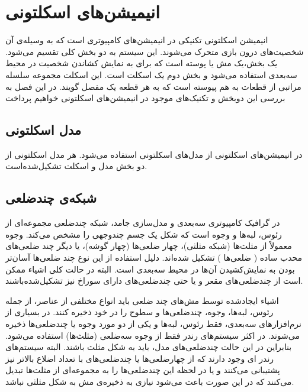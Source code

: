 \chapter { انیمیشن‌های اسکلتونی }


انیمیشن‌ اسکلتونی تکنیکی در انیمیشن‌های کامپیوتری است که به وسیله‌ی آن شخصیت‌های درون بازی متحرک می‌شوند. 
این سیستم به دو بخش کلی تقسیم می‌شود.
یک بخش،یک مش یا پوسته است که برای به نمایش کشاندن شخصیت در محیط سه‌بعدی استفاده می‌شود و بخش دوم یک اسکلت است. این اسکلت مجموعه سلسله مراتبی از قطعات به‌ هم پیوسته است که به هر قطعه یک مفصل گویند.
در این فصل به بررسی این دوبخش و تکنیک‌های موجود در انیمیشن‌های اسکلتونی خواهیم پرداخت

\section{مدل اسکلتونی}

در انیمیشن‌های اسکلتونی از مدل‌های اسکلتونی استفاده می‌شود. هر مدل اسکلتونی از دو بخش مدل و اسکلت تشکیل‌شده‌است. 

\section{شبکه‌ی\protect{} چندضلعی}

در گرافیک کامپیوتری سه‌بعدی و مدل‌سازی جامد، شبکه چند‌ضلعی مجموعه‌ای از رئوس، لبه‌ها و وجوه است که شکل یک جسم چند‌وجهی را مشخص می‌کند.
وجوه معمولاً از مثلث‌ها (شبکه مثلثی)، چهار ضلعی‌ها (چهار گوشه)، یا دیگر چند ضلعی‌های محدب ساده
(
	ضلعی‌ها
)
تشکیل شده‌اند. دلیل استفاده از این نوع چند ضلعی‌ها آسان‌تر بودن به نمایش‌کشیدن آن‌ها در محیط سه‌بعدی است.
البته در حالت کلی اشیاء ممکن است از چندضلعی‌های مقعر و یا حتی چندضلعی‌های دارای سوراخ نیز تشکیل‌شده‌باشند.

اشیاء ایجادشده توسط مش‌های چند ضلعی باید انواع مختلفی از عناصر، از جمله رئوس، لبه‌ها، وجوه، چندضلعی‌ها و سطوح را در خود ذخیره کنند.
در بسیاری از نرم‌افزارهای سه‌بعدی، فقط رئوس، لبه‌ها و یکی از دو مورد وجوه یا چند‌ضلعی‌ها ذخیره می‌شوند.
در اکثر سیستم‌های رندر
فقط از وجوه سه‌ضلعی
(مثلث‌ها)
استفاده‌ می‌شود.
بنابراین در این حالت چند‌ضلعی‌های مدل، باید به شکل مثلث باشند. البته سیستم‌های رندر‌ ای وجود دارند که از چهارضلعی‌ها یا چندضلعی‌های با تعداد اضلاع بالاتر نیز پشتیبانی ‌می‌کنند و یا در لحظه این چندضلعی‌ها را به مجموعه‌ای از مثلث‌ها تبدیل می‌کنند که در این صورت باعث ‌می‌شود نیازی به ذخیره‌ی مش به شکل مثلثی نباشد.

